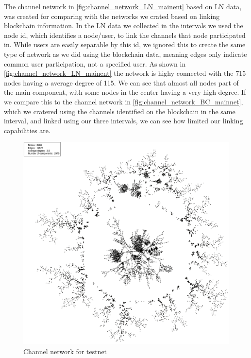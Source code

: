 The channel network in \cref{fig:channel_network_LN_mainent} based on LN data, was created for comparing with the networks we crated based on linking blockchain information. In the LN data we collected in the intervals we used the node id, which identifies a node/user, to link the channels that node participated in. While users are easily separable by this id, we ignored this to create the same type of network as we did using the blockchain data, meaning edges only indicate common user participation, not a specified user. 
As shown in \cref{fig:channel_network_LN_mainent} the network is highy connected with the 715 nodes having a average degree of 115. We can see that almost all nodes part of the main component, with some nodes in the center having a very high degree.
If we compare this to the channel network in \cref{fig:channel_network_BC_mainnet}, which we cratered using the channels identified on the blockchain in the same interval, and linked using our three intervals, we can see how limited our linking capabilities are.

\begin{figure}[ht]
    \centering
    \includegraphics[width=13cm]{figures/graphs/cg_bc_testnet_full.png}
    \caption{Channel network for testnet}
    \label{fig:cg_testnet_full}
\end{figure}

